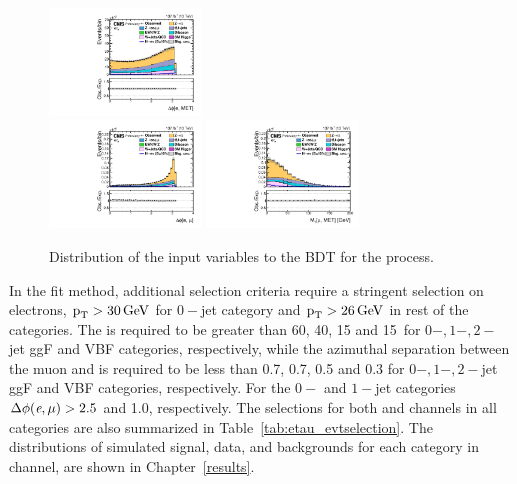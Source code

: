 \begin{figure}[htbp!]
  \includegraphics[width=0.36\textwidth]{plots/chapter6/emu/dPhiEMET.pdf}\\
  \includegraphics[width=0.36\textwidth]{plots/chapter6/emu/dPhiEMu.pdf}
  \includegraphics[width=0.36\textwidth]{plots/chapter6/emu/MTMuMET.pdf}\\
  \caption{Distribution of the input variables to the BDT for the \emu process.}
  \label{fig:input_em}
\end{figure}

In the \mcol fit method, additional selection criteria require a stringent selection on electrons, $\text{p}_\text{T} > 30 \,\text{Ge\hspace{-.08em}V}$ for $0-$jet category and $\text{p}_\text{T} > 26 \,\text{Ge\hspace{-.08em}V}$ in rest of the categories. The \mtemet is required to be greater than 60, 40, 15 and 15~\GeV for $0-, 1-, 2-$jet ggF and VBF categories, respectively, while the azimuthal separation between the muon and \ptvecmiss is required to be less than 0.7, 0.7, 0.5 and 0.3 for $0-, 1-, 2-$jet ggF and VBF categories, respectively. For the $0-$ and $1-$jet categories $\Delta\phi(\textit{e},\mu) > 2.5$ and 1.0, respectively. The selections for both \ehad and \emu channels in all categories are also summarized in Table~\ref{tab:etau_evtselection}. The \mcol distributions of simulated signal, data, and backgrounds for each category in \emu channel, are shown in Chapter~\ref{results}.

